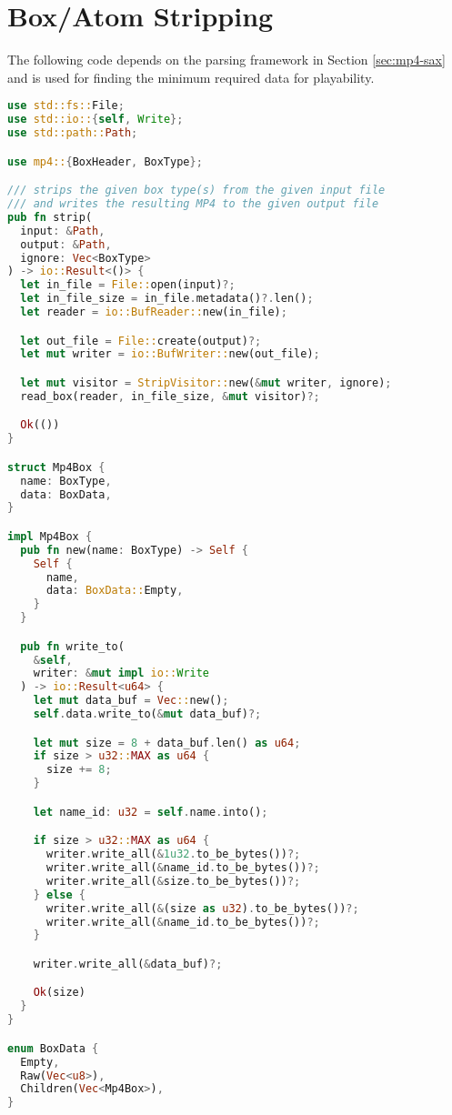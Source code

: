 \newpage

\section{Box/Atom Stripping}

The following code depends on the parsing framework in Section \ref{sec:mp4-sax} and is used for finding the minimum required data for playability.

\begin{lstlisting}[language=Rust]
use std::fs::File;
use std::io::{self, Write};
use std::path::Path;

use mp4::{BoxHeader, BoxType};

/// strips the given box type(s) from the given input file
/// and writes the resulting MP4 to the given output file
pub fn strip(
  input: &Path,
  output: &Path,
  ignore: Vec<BoxType>
) -> io::Result<()> {
  let in_file = File::open(input)?;
  let in_file_size = in_file.metadata()?.len();
  let reader = io::BufReader::new(in_file);

  let out_file = File::create(output)?;
  let mut writer = io::BufWriter::new(out_file);

  let mut visitor = StripVisitor::new(&mut writer, ignore);
  read_box(reader, in_file_size, &mut visitor)?;

  Ok(())
}

struct Mp4Box {
  name: BoxType,
  data: BoxData,
}

impl Mp4Box {
  pub fn new(name: BoxType) -> Self {
    Self {
      name,
      data: BoxData::Empty,
    }
  }

  pub fn write_to(
    &self,
    writer: &mut impl io::Write
  ) -> io::Result<u64> {
    let mut data_buf = Vec::new();
    self.data.write_to(&mut data_buf)?;

    let mut size = 8 + data_buf.len() as u64;
    if size > u32::MAX as u64 {
      size += 8;
    }

    let name_id: u32 = self.name.into();

    if size > u32::MAX as u64 {
      writer.write_all(&1u32.to_be_bytes())?;
      writer.write_all(&name_id.to_be_bytes())?;
      writer.write_all(&size.to_be_bytes())?;
    } else {
      writer.write_all(&(size as u32).to_be_bytes())?;
      writer.write_all(&name_id.to_be_bytes())?;
    }

    writer.write_all(&data_buf)?;

    Ok(size)
  }
}

enum BoxData {
  Empty,
  Raw(Vec<u8>),
  Children(Vec<Mp4Box>),
}


\end{lstlisting}

